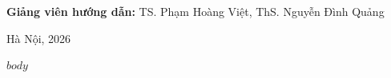 \documentclass[a4paper,12pt]{report}
\begin{document}
\begin{titlepage}
\begin{center}
\vspace{0.6cm}

{\large\textbf{Giảng viên hướng dẫn:} TS. Phạm Hoàng Việt, ThS. Nguyễn Đình Quảng}

\vfill

{\large Hà Nội, 2026}

\end{center}
\end{titlepage}

\newpage
\begingroup
\setlength{\parskip}{0pt}
\linespread{1.0}\selectfont
\tableofcontents
\endgroup
\newpage

$body$
\end{document}
